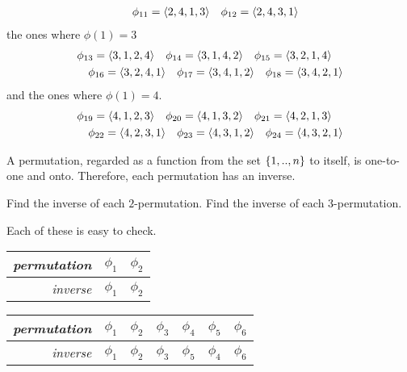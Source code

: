 \begin{exercises}
\begin{answer}
\begin{align*}
        \quad
        \phi_{11}=\langle2,4,1,3\rangle
        \quad
        \phi_{12}=\langle2,4,3,1\rangle
      \end{align*}
      the ones where $\phi(1)=3$
      \begin{align*}
        &\phi_{13}=\langle3,1,2,4\rangle
        \quad
        \phi_{14}=\langle3,1,4,2\rangle
        \quad
        \phi_{15}=\langle3,2,1,4\rangle  \\
        &\quad
        \phi_{16}=\langle3,2,4,1\rangle
        \quad
        \phi_{17}=\langle3,4,1,2\rangle
        \quad
        \phi_{18}=\langle3,4,2,1\rangle
      \end{align*}
      and the ones where $\phi(1)=4$.
      \begin{align*}
        &\phi_{19}=\langle4,1,2,3\rangle
        \quad
        \phi_{20}=\langle4,1,3,2\rangle
        \quad
        \phi_{21}=\langle4,2,1,3\rangle  \\
        &\quad
        \phi_{22}=\langle4,2,3,1\rangle
        \quad
        \phi_{23}=\langle4,3,1,2\rangle
        \quad
        \phi_{24}=\langle4,3,2,1\rangle
      \end{align*}
    \end{answer}
  \item 
    A permutation, regarded as a function from the set
    $\mbox{$\{1,..,n\}$}$ to itself, is one-to-one and onto.
    Therefore, each permutation has an inverse. 
    \begin{exparts}
      \partsitem Find the inverse of each $2$-permutation.
      \partsitem Find the inverse of each $3$-permutation.
    \end{exparts}
    \begin{answer}
      Each of these is easy to check.
      \begin{exparts*}
        \partsitem 
          \begin{tabular}[t]{r|cc}
            \textit{permutation} &$\phi_1$  &$\phi_2$ \\
             \hline
            \textit{inverse}     &$\phi_1$  &$\phi_2$ 
          \end{tabular}
        \partsitem 
          \begin{tabular}[t]{r|cccccc}
            \textit{permutation} 
              &$\phi_1$ &$\phi_2$ &$\phi_3$ &$\phi_4$ &$\phi_5$ &$\phi_6$ \\
            \hline
            \textit{inverse}
              &$\phi_1$ &$\phi_2$ &$\phi_3$ &$\phi_5$ &$\phi_4$ &$\phi_6$ 
          \end{tabular}
      \end{exparts*}

\end{answer}
\end{exercises}
